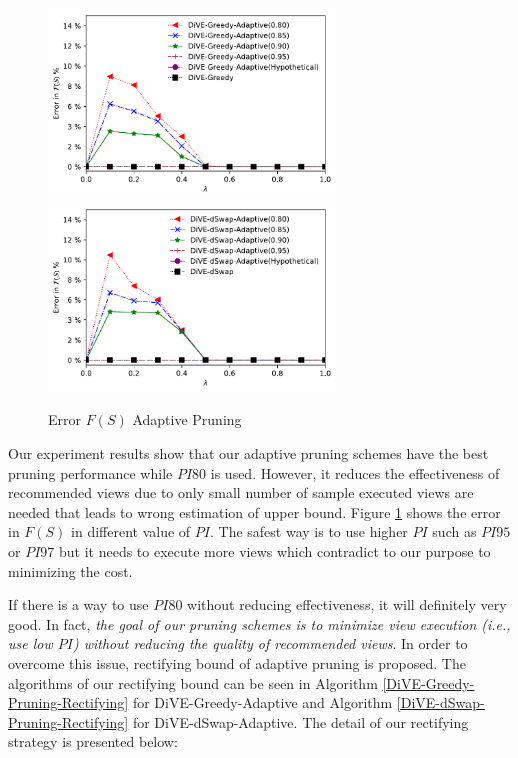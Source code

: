 \documentclass{article}
\begin{document}
\begin{figure}
	\begin{center}
		\vspace{-15pt}
		\includegraphics[width=3.0in]{figures/rectifiying_error_f_s_greedy}
		\includegraphics[width=3.0in]{figures/rectifiying_error_f_s_dswap}
		\caption{Error $F(S)$ Adaptive Pruning}
		\label{fig:error_fs_adaptive}
	\end{center}
\end{figure}

Our experiment results show that our adaptive pruning schemes have the best pruning performance while $PI80$ is used. However, it reduces the effectiveness of recommended views due to only small number of sample executed views are needed that leads to wrong estimation of upper bound. Figure \ref{fig:error_fs_adaptive} shows the error in $F(S)$ in different value of $PI$. The safest way is to use higher $ PI $ such as $ PI95 $ or $ PI97 $ but it needs to execute more views which contradict to our purpose to minimizing the cost.  

If there is a way to use $ PI80 $ without reducing effectiveness, it will definitely very good. In fact, \textit{the goal of our pruning schemes is to minimize view execution (i.e., use low $PI$) without reducing the quality of recommended views}. In order to overcome this issue, rectifying bound of adaptive pruning is proposed. The algorithms of our rectifying bound can be seen in Algorithm \ref{DiVE-Greedy-Pruning-Rectifying} for DiVE-Greedy-Adaptive and Algorithm \ref{DiVE-dSwap-Pruning-Rectifying} for DiVE-dSwap-Adaptive. The detail of our rectifying strategy is presented below:
\end{document}
